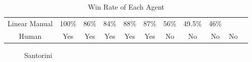 \documentclass[a4paper,12pt,table]{article}
\begin{document}
\begin{table}[H]
{\begin{tabular}{|c|cccccccccc}
    Linear Manual & \multicolumn{1}{c|}{100\%}                       & \multicolumn{1}{c|}{86\%}                        & \multicolumn{1}{c|}{84\%}                      & \multicolumn{1}{c|}{88\%}                       & \multicolumn{1}{c|}{87\%}                       & \multicolumn{1}{c|}{56\%}                           & \multicolumn{1}{c|}{49.5\%}                     & \multicolumn{1}{c|}{46\%}                        & \cellcolor[HTML]{000000}                        & \cellcolor[HTML]{000000}                        \\ \cline{1-10}
    Human          & \multicolumn{1}{c|}{Yes}                      & \multicolumn{1}{c|}{Yes}                      & \multicolumn{1}{c|}{Yes}                           & \multicolumn{1}{c|}{Yes}                      & \multicolumn{1}{c|}{Yes}                           & \multicolumn{1}{c|}{No}                           & \multicolumn{1}{c|}{No}                           & \multicolumn{1}{c|}{No}                           & \multicolumn{1}{c|}{No}                           & \cellcolor[HTML]{000000}                        \\ \cline{1-10}
    \end{tabular}
    }
    \caption{Win Rate of Each Agent}
    \label{table:}
\end{table}

\begin{figure}[H]
    \centering
    \qquad
    \caption{Santorini}
    \label{fig:}
\end{figure}
\end{document}

